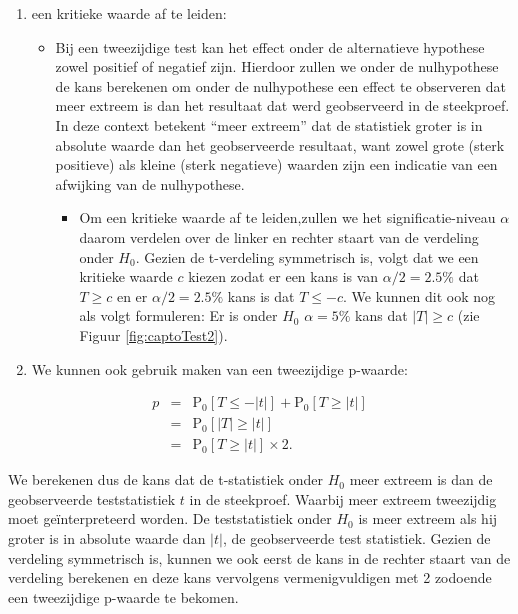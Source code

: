 \documentclass[
  12pt,dutch,coursenotes]{book}
\providecommand{\tightlist}{%
  \setlength{\itemsep}{0pt}\setlength{\parskip}{0pt}}
\theoremstyle{definition}
\theoremstyle{definition}
\theoremstyle{definition}
\theoremstyle{definition}
\theoremstyle{remark}
\begin{document}
\begin{enumerate}
\def\labelenumi{\arabic{enumi}.}
\tightlist
\item
  een kritieke waarde af te leiden:

  \begin{itemize}
  \tightlist
  \item
    Bij een tweezijdige test kan het effect onder de alternatieve hypothese zowel positief of negatief zijn. Hierdoor zullen we onder de nulhypothese de kans berekenen om onder de nulhypothese een effect te observeren dat meer extreem is dan het resultaat dat werd geobserveerd in de steekproef. In deze context betekent ``meer extreem'' dat de statistiek groter is in absolute waarde dan het geobserveerde resultaat, want zowel grote (sterk positieve) als kleine (sterk negatieve) waarden zijn een indicatie van een afwijking van de nulhypothese.

    \begin{itemize}
    \tightlist
    \item
      Om een kritieke waarde af te leiden,zullen we het significatie-niveau \(\alpha\) daarom verdelen over de linker en rechter staart van de verdeling onder \(H_0\). Gezien de t-verdeling symmetrisch is, volgt dat we een kritieke waarde \(c\) kiezen zodat er een kans is van \(\alpha/2=2.5\%\) dat \(T\geq c\) en er \(\alpha/2=2.5\%\) kans is dat \(T\leq -c\). We kunnen dit ook nog als volgt formuleren: Er is onder \(H_0\) \(\alpha=5\%\) kans dat \(\vert T\vert\geq c\) (zie Figuur \ref{fig:captoTest2}).
    \end{itemize}
  \end{itemize}
\item
  We kunnen ook gebruik maken van een tweezijdige p-waarde:
\end{enumerate}

\begin{eqnarray*}
  p&=&\text{P}_0\left[T\leq -|t|\right] + \text{P}_0\left[T\geq |t|\right]\\
  &=&\text{P}_0\left[\vert T\vert \geq \vert t \vert\right]\\
  &=&\text{P}_0\left[T \geq \vert t \vert\right]\times 2.
\end{eqnarray*}

We berekenen dus de kans dat de t-statistiek onder \(H_0\) meer extreem is dan de geobserveerde teststatistiek \(t\) in de steekproef.
Waarbij meer extreem tweezijdig moet geïnterpreteerd worden.
De teststatistiek onder \(H_0\) is meer extreem als hij groter is in absolute waarde dan \(\vert t \vert\), de geobserveerde test statistiek.
Gezien de verdeling symmetrisch is, kunnen we ook eerst de kans in de rechter staart van de verdeling berekenen en deze kans vervolgens vermenigvuldigen met 2 zodoende een tweezijdige p-waarde te bekomen.
\end{document}
